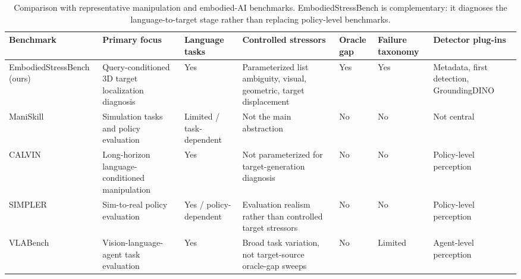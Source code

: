 \begin{table}[t]
\centering
\caption{Comparison with representative manipulation and embodied-AI benchmarks. EmbodiedStressBench is complementary: it diagnoses the language-to-target stage rather than replacing policy-level benchmarks.}
\label{tab:benchmark-comparison}
\scriptsize
\begin{tabular}{p{}p{}p{}p{}p{}p{}p{}}
\toprule
Benchmark & Primary focus & Language tasks & Controlled stressors & Oracle gap & Failure taxonomy & Detector plug-ins \\
\midrule
EmbodiedStressBench (ours) & Query-conditioned 3D target localization diagnosis & Yes & Parameterized list ambiguity, visual, geometric, target displacement & Yes & Yes & Metadata, first detection, GroundingDINO \\
ManiSkill \cite{gu2021maniskill,gu2023maniskill2} & Simulation tasks and policy evaluation & Limited / task-dependent & Not the main abstraction & No & No & Not central \\
CALVIN \cite{mees2022calvin} & Long-horizon language-conditioned manipulation & Yes & Not parameterized for target-generation diagnosis & No & No & Policy-level perception \\
SIMPLER \cite{li2024simpler} & Sim-to-real policy evaluation & Yes / policy-dependent & Evaluation realism rather than controlled target stressors & No & No & Policy-level perception \\
VLABench \cite{zhang2024vlabench} & Vision-language-agent task evaluation & Yes & Broad task variation, not target-source oracle-gap sweeps & No & Limited & Agent-level perception \\
\bottomrule
\end{tabular}
\end{table}
